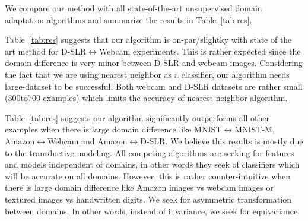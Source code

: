 \begin{table}[t]
\caption{Accuracy of our method and the digit classification task.}
\label{tab:res}
\begin{sc}
\begin{small}
\end{small}
\end{sc}
\end{table}

We compare our method with all state-of-the-art unsupervised domain adaptation algorithms and summarize the results in Table~\ref{tab:res}. 

Table~\ref{tab:res} suggests that our algorithm is on-par/slightky with state of the art method for D-SLR$\leftrightarrow$Webcam experiments. This is rather expected since the domain difference is very minor between D-SLR and webcam images. Considering the fact that we are using nearest neighbor as a classifier, our algorithm needs large-dataset to be successful. Both webcam and D-SLR datasets are rather small (300to700 examples) which limits the accuracy of nearest neighbor algorithm.

Table~\ref{tab:res} suggests our algorithm significantly outperforms all other examples when there is large domain difference like MNIST$\leftrightarrow$MNIST-M, Amazon$\leftrightarrow$Webcam and Amazon$\leftrightarrow$D-SLR. We believe this results is mostly due to the transductive modeling. All competing algorithms are seeking for features and models independent of domains, in other words they seek of classifiers which will be accurate on all domains. However, this is rather counter-intuitive when there is large domain difference like Amazon images vs webcam images or textured images vs handwritten digits. We seek for asymmetric transformation between domains. In other words, instead of invariance, we seek for equivariance. 


